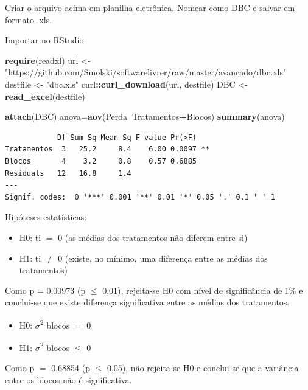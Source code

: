 \documentclass[12pt,brazil,oneside]{book}
\newenvironment{Shaded}{\begin{snugshade}}{\end{snugshade}}
\newcommand{\KeywordTok}[1]{\textcolor[rgb]{0.13,0.29,0.53}{\textbf{#1}}}
\newcommand{\NormalTok}[1]{#1}
\newcommand{\OperatorTok}[1]{\textcolor[rgb]{0.81,0.36,0.00}{\textbf{#1}}}
\newcommand{\StringTok}[1]{\textcolor[rgb]{0.31,0.60,0.02}{#1}}
\providecommand{\tightlist}{%
  \setlength{\itemsep}{0pt}\setlength{\parskip}{0pt}}
\begin{document}
Criar o arquivo acima em planilha eletrônica. Nomear como DBC e salvar
em formato .xls.

Importar no RStudio:

\begin{Shaded}
\begin{Highlighting}[]
\KeywordTok{require}\NormalTok{(readxl)}
\NormalTok{url <-}\StringTok{ "https://github.com/Smolski/softwarelivrer/raw/master/avancado/dbc.xls"}
\NormalTok{destfile <-}\StringTok{ "dbc.xls"}
\NormalTok{curl}\OperatorTok{::}\KeywordTok{curl_download}\NormalTok{(url, destfile)}
\NormalTok{DBC  <-}\StringTok{ }\KeywordTok{read_excel}\NormalTok{(destfile)}

\KeywordTok{attach}\NormalTok{(DBC)}
\NormalTok{anova=}\KeywordTok{aov}\NormalTok{(Perda}\OperatorTok{~}\NormalTok{Tratamentos}\OperatorTok{+}\NormalTok{Blocos)}
\KeywordTok{summary}\NormalTok{(anova)}
\end{Highlighting}
\end{Shaded}

\begin{verbatim}
            Df Sum Sq Mean Sq F value Pr(>F)   
Tratamentos  3   25.2     8.4    6.00 0.0097 **
Blocos       4    3.2     0.8    0.57 0.6885   
Residuals   12   16.8     1.4                  
---
Signif. codes:  0 '***' 0.001 '**' 0.01 '*' 0.05 '.' 0.1 ' ' 1
\end{verbatim}

Hipóteses estatísticas:

\begin{itemize}
\tightlist
\item
  H0: ti \(=\) 0 (as médias dos tratamentos não diferem entre si)
\item
  H1: ti \(\neq\) 0 (existe, no mínimo, uma diferença entre as médias
  dos tratamentos)
\end{itemize}

Como p = 0,00973 (p \(\leq\) 0,01), rejeita-se H0 com nível de
significância de 1\% e conclui-se que existe diferença significativa
entre as médias dos tratamentos.

\begin{itemize}
\tightlist
\item
  H0: \(\sigma\)\textsuperscript{2} blocos \(=\) 0
\item
  H1: \(\sigma\)\textsuperscript{2} blocos \(\leq\) 0
\end{itemize}

Como p \(=\) 0,68854 (p \(\leq\) 0,05), não rejeita-se H0 e conclui-se
que a variância entre os blocos não é significativa.
\end{document}
